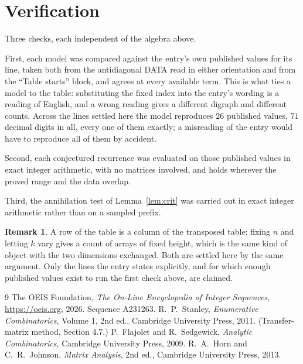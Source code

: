 \documentclass[11pt,a4paper]{article}
\theoremstyle{plain}
\theoremstyle{definition}
\newtheorem{remark}[theorem]{Remark}
\begin{document}
\section{Verification}

Three checks, each independent of the algebra above.

First, each model was compared against the entry's own published values for its line, taken
both from the antidiagonal DATA read in either orientation and from the ``Table starts''
block, and agrees at every available term. This is what ties a model to the table:
substituting the fixed index into the entry's wording is a reading of English, and a wrong
reading gives a different digraph and different counts. Across the lines settled here the
model reproduces $26$ published values, $71$ decimal digits in all, every one of
them exactly; a misreading of the entry would have to reproduce all of them by accident.

Second, each conjectured recurrence was evaluated on those published values in exact
integer arithmetic, with no matrices involved, and holds wherever the proved range and the
data overlap.

Third, the annihilation test of Lemma~\ref{lem:crit} was carried out in exact integer
arithmetic rather than on a sampled prefix.

\begin{remark}
A row of the table is a column of the transposed table: fixing $n$ and letting $k$ vary gives a
count of arrays of fixed height, which is the same kind of object with the two dimensions
exchanged. Both are settled here by the same argument. Only the lines the entry states
explicitly, and for which enough published values exist to run the first check above, are
claimed.
\end{remark}

\begin{thebibliography}{9}
 The OEIS Foundation, \emph{The On-Line Encyclopedia of Integer
Sequences}, \url{https://oeis.org}, 2026. Sequence A231263.
 R.~P.~Stanley, \emph{Enumerative Combinatorics}, Volume 1, 2nd ed.,
Cambridge University Press, 2011. (Transfer-matrix method, Section 4.7.)
 P.~Flajolet and R.~Sedgewick, \emph{Analytic Combinatorics}, Cambridge
University Press, 2009.
 R.~A.~Horn and C.~R.~Johnson, \emph{Matrix Analysis}, 2nd ed., Cambridge
University Press, 2013.
\end{thebibliography}
\end{document}
